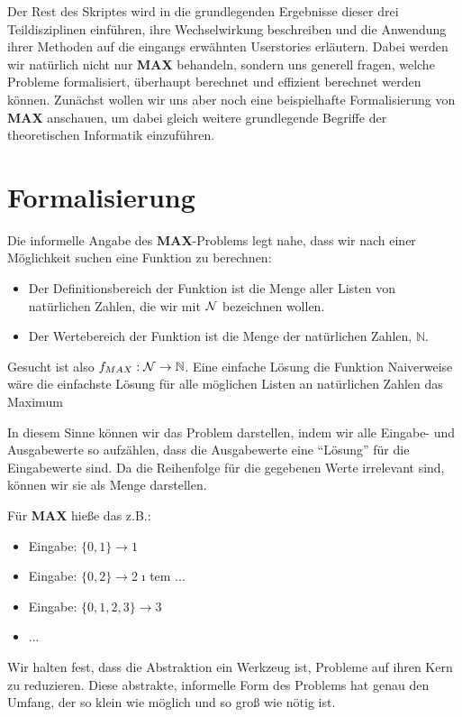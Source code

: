 Der Rest des Skriptes wird in die grundlegenden Ergebnisse dieser drei Teildisziplinen einführen,
ihre Wechselwirkung beschreiben
und die Anwendung ihrer Methoden auf die eingangs erwähnten Userstories erläutern.
Dabei werden wir natürlich nicht nur \textbf{MAX} behandeln, sondern uns generell fragen,
welche Probleme formalisiert, überhaupt berechnet und effizient berechnet werden können.
Zunächst wollen wir uns aber noch eine beispielhafte Formalisierung von \textbf{MAX}
anschauen, um dabei gleich weitere grundlegende Begriffe der theoretischen Informatik
einzuführen.

\section{Formalisierung}
\noindent
Die informelle Angabe des \textbf{MAX}-Problems legt nahe, dass wir nach einer Möglichkeit suchen
eine Funktion zu berechnen:
\begin{itemize}
    \item Der Definitionsbereich der Funktion ist die Menge aller Listen von natürlichen Zahlen,
        die wir mit $\cal{N}$ bezeichnen wollen.
    \item Der Wertebereich der Funktion ist die Menge der natürlichen Zahlen, $\mathbb{N}$.
\end{itemize}
Gesucht ist also $f_{MAX}: \cal{N} \rightarrow \mathbb{N}$.
Eine einfache Lösung die Funktion
Naiverweise wäre die einfachste Lösung für alle möglichen Listen an natürlichen Zahlen
das Maximum 



In diesem Sinne können wir das Problem darstellen,
indem wir alle Eingabe- und Ausgabewerte so aufzählen,
dass die Ausgabewerte eine ``Lösung'' für die Eingabewerte sind.
Da die Reihenfolge für die gegebenen Werte irrelevant sind,
können wir sie als Menge darstellen.



Für \textbf{MAX} hieße das z.B.:
\begin{itemize}
    \item Eingabe: $\{0, 1\} \rightarrow 1$
    \item Eingabe: $\{0, 2\} \rightarrow 2$
    \i
tem ... 
    \item Eingabe: $\{0, 1, 2, 3\} \rightarrow 3$
    \item ... 
\end{itemize}
Wir halten fest, dass die Abstraktion ein Werkzeug ist,
Probleme auf ihren Kern zu reduzieren.
Diese abstrakte, informelle Form des Problems hat genau den Umfang,
der so klein wie möglich und so groß wie nötig ist.

